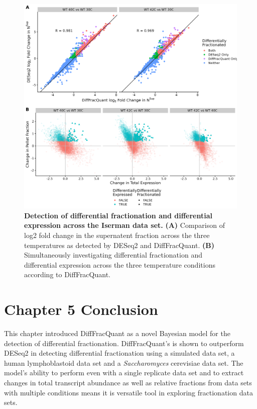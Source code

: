 \documentclass[../main.tex]{subfiles}
\begin{document}
\begin{figure}[p!]

{\centering \includegraphics[width=1\linewidth]{figures/DESeq_vs_bayesian_multi_temp_iserman_combined.png} 

}

\caption[Differential fractionation across conditions.]{\textbf{Detection of differential fractionation and differential expression across the Iserman data set.} \textbf{(A)} Comparison of log2 fold change in the supernatent fraction across the three temperatures as detected by DESeq2 and DiffFracQuant. \textbf{(B)} Simultaneously investigating differential fractionation and differential expression across the three temperature conditions according to DiffFracQuant.} \label{fig:diff-exp-temp}
\end{figure}

\section{Chapter 5 Conclusion}

This chapter introduced DiffFracQuant as a novel Bayesian model for the detection of differential fractionation.
DiffFracQuant's is shown to outperform DESeq2 in detecting differential fractionation using a simulated data set, a human lymphoblastoid data set and a \textit{Saccharomyces} cerevisiae data set.
The model's ability to perform even with a single replicate data set and to extract changes in total transcript abundance as well as relative fractions from data sets with multiple conditions means it is versatile tool in exploring fractionation data sets.
\end{document}
